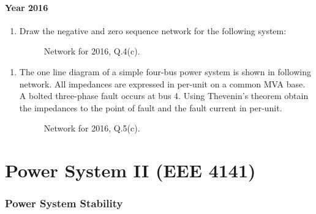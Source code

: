 \documentclass[12pt, a4paper]{article}
\begin{document}
	\subsection{Year 2016}
	\begin{enumerate}[label=\textbf{Q4(c).}, wide, labelindent=0pt]
		\item Draw the negative and zero sequence network for the following system:
		\begin{figure}[h!]
			\centering
			\caption{Network for 2016, Q.4(c).}
		\end{figure}
	\end{enumerate}
	\begin{enumerate}[label=\textbf{Q5(c).}, wide, labelindent=0pt]
		\item The one line diagram of a simple four-bus power system is shown in following network. All impedances are expressed in per-unit on a common MVA base. A bolted three-phase fault occurs at bus 4. Using Thevenin's theorem obtain the impedances to the point of fault and the fault current in per-unit.
		\begin{figure}[h!]
			\centering
			\caption{Network for 2016, Q.5(c).}
		\end{figure}
	\end{enumerate}
	
	\newpage
	
	\part{Power System II (EEE 4141)}
	
	\section{Power System Stability}
\end{document}
